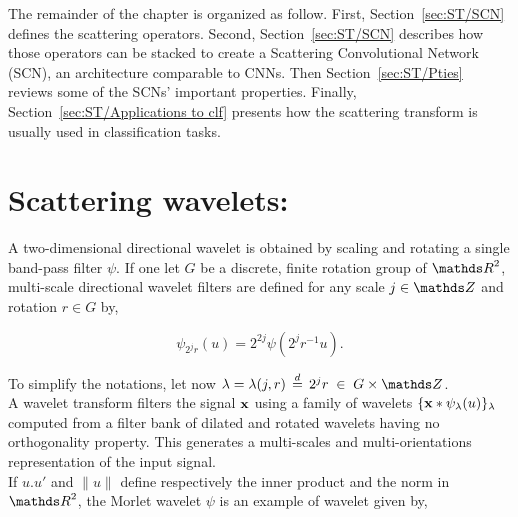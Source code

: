 \documentclass[a4paper,11pt]{report}
\begin{document}
	The remainder of the chapter is organized as follow. First, Section~\ref{sec:ST/SCN} defines the scattering operators. Second, Section~\ref{sec:ST/SCN} describes how those operators can be stacked to create a Scattering Convolutional Network (SCN), an architecture comparable to CNNs. Then Section~\ref{sec:ST/Pties} reviews some of the SCNs' important properties. Finally, Section~\ref{sec:ST/Applications to clf} presents how the scattering transform is usually used in classification tasks.
	
% 
% 	    
      
		\section{Scattering wavelets:}
			\label{sec:ST/Scattering wavelets}

			A two-dimensional directional wavelet is obtained by scaling and rotating a single band-pass filter $\psi$. If one let $G$ be a discrete, finite rotation group of $\dsR^{2}$, multi-scale directional wavelet filters are defined for any scale $j \in \dsZ$ and rotation $r \in G$ by,
      
      \begin{equation}
				\label{eq:multi-scale directional wavelet}
				\psi_{2^{j}r}(u) = 2^{2j} \psi(2^{j}r^{-1}u).
      \end{equation}
      
      To simplify the notations, let now $\lambda = \lambda(j,r) \; \eqdef \; 2^{j}r \; \in \; G \times \dsZ$.\\
      
      A wavelet transform filters the signal ${\bf x}$ using a family of wavelets $\{{\bf x} \ast \psi_{\lambda}(u)\}_{\lambda}$ computed from a filter bank of dilated and rotated wavelets having no orthogonality property. This generates a multi-scales and multi-orientations representation of the input signal.\\ 
      
      If $u.u'$ and $\|u\|$ define respectively the inner product and the norm in $\dsR^{2}$, the Morlet wavelet $\psi$ is an example of wavelet given by,
      
\end{document}

